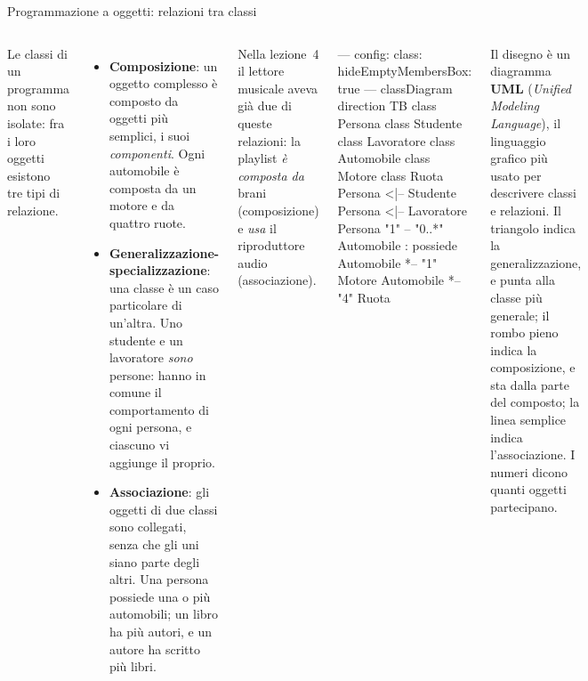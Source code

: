 \documentclass[10pt,aspectratio=169]{beamer}
\begin{document}
\begin{frame}[fragile]{Programmazione a oggetti: relazioni tra classi}
\begin{columns}[T]
\small
Le classi di un programma non sono isolate: fra i loro oggetti esistono tre tipi di relazione.
\begin{itemize}\itemsep=4pt
    \item \textbf{Composizione}: un oggetto complesso è composto da oggetti più semplici, i suoi \emph{componenti}. Ogni automobile è composta da un motore e da quattro ruote.
    \item \textbf{Generalizzazione-specializzazione}: una classe è un caso particolare di un'altra. Uno studente e un lavoratore \emph{sono} persone: hanno in comune il comportamento di ogni persona, e ciascuno vi aggiunge il proprio.
    \item \textbf{Associazione}: gli oggetti di due classi sono collegati, senza che gli uni siano parte degli altri. Una persona possiede una o più automobili; un libro ha più autori, e un autore ha scritto più libri.
\end{itemize}

\vspace{0.1cm}
Nella lezione~4 il lettore musicale aveva già due di queste relazioni: la playlist \emph{è composta da} brani (composizione) e \emph{usa} il riproduttore audio (associazione).

\begin{mermaid}
---
config:
  class:
    hideEmptyMembersBox: true
---
classDiagram
  direction TB
  class Persona
  class Studente
  class Lavoratore
  class Automobile
  class Motore
  class Ruota
  Persona <|-- Studente
  Persona <|-- Lavoratore
  Persona "1" -- "0..*" Automobile : possiede
  Automobile *-- "1" Motore
  Automobile *-- "4" Ruota
\end{mermaid}
\footnotesize
Il disegno è un diagramma \textbf{UML} (\emph{Unified Modeling Language}), il linguaggio grafico più usato per descrivere classi e relazioni. Il triangolo indica la generalizzazione, e punta alla classe più generale; il rombo pieno indica la composizione, e sta dalla parte del composto; la linea semplice indica l'associazione. I numeri dicono quanti oggetti partecipano.
\end{columns}
\end{frame}
\end{document}
